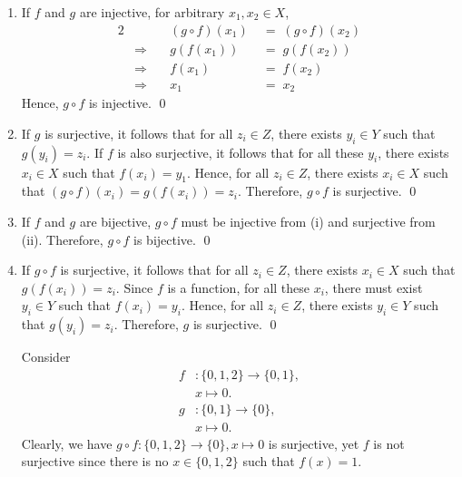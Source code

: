 \documentclass[10pt]{article}
\begin{document}
        \begin{enumerate}
                \item If $f$ and $g$ are injective, for arbitrary $x_1, x_2 \in X$,
                \begin{alignat*}{2}
                        &&(g\circ f)(x_1) \;&=\; (g \circ f)(x_2) \\
                        &\Rightarrow\quad& g(f(x_1)) \;&=\; g(f(x_2)) \\
                        &\Rightarrow\quad& f(x_1) \;&=\; f(x_2) \tag{Injectivity of $g$}\\
                        &\Rightarrow\quad& x_1 \;&=\; x_2 \tag{Injectivity of $f$}
                \end{alignat*}
                Hence, $g\circ f$ is injective. \qed

                \item If $g$ is surjective, it follows that for all $z_i \in Z$, there exists $y_i \in Y$ such that
                $g(y_i) = z_i$. If $f$ is also surjective, it follows that for all these $y_i$, there exists $x_i \in X$ such that
                $f(x_i) = y_1$. Hence, for all $z_i \in Z$, there exists $x_i \in X$ such that $(g\circ f)(x_i) = g(f(x_i)) = z_i$.
                Therefore, $g\circ f$ is surjective. \qed

                \item If $f$ and $g$ are bijective, $g\circ f$ must be injective from (i) and surjective from (ii).
                Therefore, $g\circ f$ is bijective. \qed

                \item If $g\circ f$ is surjective, it follows that for all $z_i \in Z$, there exists $x_i \in X$ such that
                $g(f(x_i)) = z_i$. Since $f$ is a function, for all these $x_i$, there must exist $y_i \in Y$ such that
                $f(x_i) = y_i$. Hence, for all $z_i \in Z$, there exists $y_i \in Y$ such that $g(y_i) = z_i$.
                Therefore, $g$ is surjective. \qed

                Consider
                \begin{align*}
                        f &: \{0, 1, 2\}  \to \{0, 1\},\\
                        &x \mapsto 0.\\
                        g &: \{0, 1\} \to \{0\},\\
                        &x \mapsto 0.
                \end{align*}
                Clearly, we have $g\circ f: \{0, 1, 2\} \to \{0\}, x\mapsto 0$ is surjective, yet $f$ is not surjective since 
                there is no $x \in \{0, 1, 2\}$ such that $f(x) = 1$.


\end{enumerate}
\end{document}
